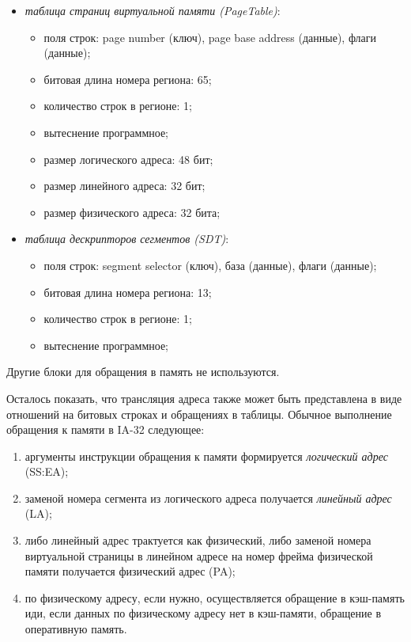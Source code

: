 \begin{itemize}
  \item \emph{таблица страниц виртуальной памяти (PageTable)}:
    \begin{itemize}
        \item поля строк: page number (ключ), page base address (данные), флаги
(данные);
        \item битовая длина номера региона: 65;
        \item количество строк в регионе: 1;
        \item вытеснение программное;
        \item размер логического адреса: 48 бит;
        \item размер линейного адреса: 32 бит;
        \item размер физического адреса: 32 бита;
    \end{itemize}


  \item \emph{таблица дескрипторов сегментов (SDT)}:
        \begin{itemize}
            \item поля строк: segment selector (ключ), база (данные), флаги
(данные);
            \item битовая длина номера региона: 13;
            \item количество строк в регионе: 1;
            \item вытеснение программное;
        \end{itemize}
\end{itemize}

Другие блоки для обращения в память не используются.

Осталось показать, что трансляция адреса также может быть представлена в виде
отношений на битовых строках и обращениях в таблицы. Обычное выполнение
обращения к памяти в IA-32 следующее:
\begin{enumerate}
    \item аргументы инструкции обращения к памяти формируется \emph{логический
адрес} (SS:EA);
    \item заменой номера сегмента из логического адреса получается
\emph{линейный адрес} (LA);
    \item либо линейный адрес трактуется как физический, либо заменой номера
виртуальной страницы в линейном адресе на номер фрейма физической памяти
получается физический адрес (PA);
    \item по физическому адресу, если нужно, осуществляется обращение в
кэш-память иди, если данных по физическому адресу нет в кэш-памяти, обращение в
оперативную память.
\end{enumerate}

